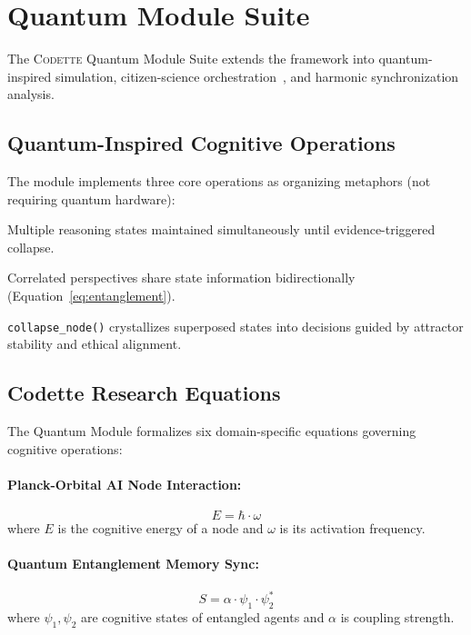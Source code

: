 \documentclass[11pt,a4paper]{article}
\newcommand{\codette}{\textsc{Codette}}
\begin{document}
\section{Quantum Module Suite}
\label{sec:quantum}

The \codette{} Quantum Module Suite extends the framework into quantum-inspired simulation, citizen-science orchestration~\citep{harrison2025citizenscience}, and harmonic synchronization analysis.

\subsection{Quantum-Inspired Cognitive Operations}
The module implements three core operations as organizing metaphors (not requiring quantum hardware):
\begin{description}[leftmargin=*]
  \item[Superposition:] Multiple reasoning states maintained simultaneously until evidence-triggered collapse.
  \item[Entanglement:] Correlated perspectives share state information bidirectionally (Equation~\ref{eq:entanglement}).
  \item[Collapse:] \texttt{collapse\_node()} crystallizes superposed states into decisions guided by attractor stability and ethical alignment.
\end{description}

\subsection{Codette Research Equations}
The Quantum Module formalizes six domain-specific equations governing cognitive operations:

\paragraph{Planck-Orbital AI Node Interaction:}
\begin{equation}
  E = \hbar \cdot \omega
  \label{eq:planck}
\end{equation}
where $E$ is the cognitive energy of a node and $\omega$ is its activation frequency.

\paragraph{Quantum Entanglement Memory Sync:}
\begin{equation}
  S = \alpha \cdot \psi_1 \cdot \psi_2^*
  \label{eq:entanglement}
\end{equation}
where $\psi_1, \psi_2$ are cognitive states of entangled agents and $\alpha$ is coupling strength.
\end{document}
